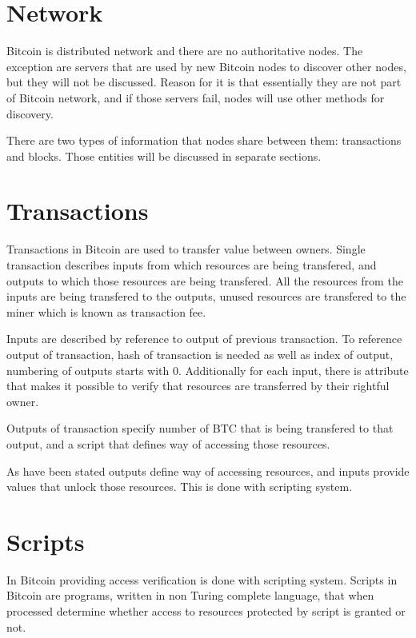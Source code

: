 \documentclass[12pt, en, eng, oneside]{mgr}
\begin{document}
\section{Network}
Bitcoin is distributed network and there are no authoritative nodes. The exception are servers that are used by new Bitcoin nodes to discover other nodes, but they will not be discussed. Reason for it is that essentially they are not part of Bitcoin network, and if those servers fail, nodes will use other methods for discovery. 

There are two types of information that nodes share between them: transactions and blocks. \cite{bitcoin-paper-1} Those entities will be discussed in separate sections.

\section{Transactions}
Transactions in Bitcoin are used to transfer value between owners. Single transaction describes inputs from which resources are being transfered, and outputs to which those resources are being transfered. All the resources from the inputs are being transfered to the outputs, unused resources are transfered to the miner which is known as transaction fee.

Inputs are described by reference to output of previous transaction. To reference output of transaction, hash of transaction is needed as well as index of output, numbering of outputs starts with 0. Additionally for each input, there is attribute that makes it possible to verify that resources are transferred by their rightful owner. \cite{bitcoin-transaction}

Outputs of transaction specify number of BTC that is being transfered to that output, and a script that defines way of accessing those resources. 

As have been stated outputs define way of accessing resources, and inputs provide values that unlock those resources. This is done with scripting system.

\section{Scripts}
In Bitcoin providing access verification is done with scripting system. Scripts in Bitcoin are programs, written in non Turing complete language, that when processed determine whether access to resources protected by script is granted or not. \cite{bitcoin-script}
\end{document}
